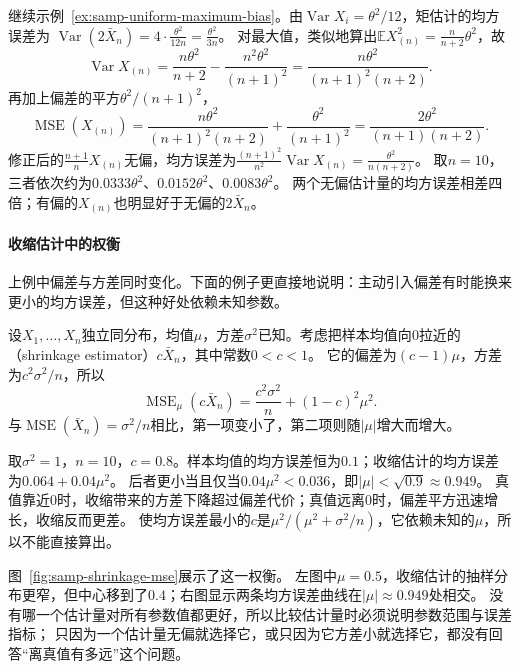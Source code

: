 \begin{example}[两个无偏估计量与一个有偏估计量]
\label{ex:samp-uniform-mse}
继续示例~\ref{ex:samp-uniform-maximum-bias}。由$\operatorname{Var}X_i=\theta^2/12$，矩估计的均方误差为
$\operatorname{Var}(2\bar X_n)=4\cdot\frac{\theta^2}{12n}=\frac{\theta^2}{3n}$。
对最大值，类似地算出$\mathbb{E}X_{(n)}^2=\frac{n}{n+2}\theta^2$，故
\[
  \operatorname{Var}X_{(n)}=\frac{n\theta^2}{n+2}-\frac{n^2\theta^2}{(n+1)^2}=\frac{n\theta^2}{(n+1)^2(n+2)}.
\]
再加上偏差的平方$\theta^2/(n+1)^2$，
\[
  \operatorname{MSE}(X_{(n)})=\frac{n\theta^2}{(n+1)^2(n+2)}+\frac{\theta^2}{(n+1)^2}=\frac{2\theta^2}{(n+1)(n+2)}.
\]
修正后的$\frac{n+1}{n}X_{(n)}$无偏，均方误差为$\frac{(n+1)^2}{n^2}\operatorname{Var}X_{(n)}=\frac{\theta^2}{n(n+2)}$。
取$n=10$，三者依次约为$0.0333\theta^2$、$0.0152\theta^2$、$0.0083\theta^2$。
两个无偏估计量的均方误差相差四倍；有偏的$X_{(n)}$也明显好于无偏的$2\bar X_n$。
\end{example}

\paragraph{收缩估计中的权衡}
上例中偏差与方差同时变化。下面的例子更直接地说明：主动引入偏差有时能换来更小的均方误差，但这种好处依赖未知参数。

设$X_1,\dots,X_n$独立同分布，均值$\mu$，方差$\sigma^2$已知。考虑把样本均值向$0$拉近的（shrinkage estimator）$c\bar X_n$，其中常数$0<c<1$。
它的偏差为$(c-1)\mu$，方差为$c^2\sigma^2/n$，所以
\[
  \operatorname{MSE}_\mu(c\bar X_n)=\frac{c^2\sigma^2}{n}+(1-c)^2\mu^2.
\]
与$\operatorname{MSE}(\bar X_n)=\sigma^2/n$相比，第一项变小了，第二项则随$|\mu|$增大而增大。

\begin{example}[收缩估计何时更好]
\label{ex:samp-shrinkage}
取$\sigma^2=1$，$n=10$，$c=0.8$。样本均值的均方误差恒为$0.1$；收缩估计的均方误差为$0.064+0.04\mu^2$。
后者更小当且仅当$0.04\mu^2<0.036$，即$|\mu|<\sqrt{0.9}\approx0.949$。
真值靠近$0$时，收缩带来的方差下降超过偏差代价；真值远离$0$时，偏差平方迅速增长，收缩反而更差。
使均方误差最小的$c$是$\mu^2/(\mu^2+\sigma^2/n)$，它依赖未知的$\mu$，所以不能直接算出。
\end{example}

图~\ref{fig:samp-shrinkage-mse}展示了这一权衡。
左图中$\mu=0.5$，收缩估计的抽样分布更窄，但中心移到了$0.4$；右图显示两条均方误差曲线在$|\mu|\approx0.949$处相交。
没有哪一个估计量对所有参数值都更好，所以比较估计量时必须说明参数范围与误差指标；
只因为一个估计量无偏就选择它，或只因为它方差小就选择它，都没有回答“离真值有多远”这个问题。


